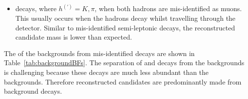 \begin{itemize}
\item \bhh decays, where $ h^{(')}  = K, \pi$, when both hadrons are mis-identified as muons. This usually occurs when the hadrons decay whilst travelling through the detector. Similar to mis-identified semi-leptonic decays, the reconstructed \bsd candidate mass is lower than expected. %
\end{itemize}

The \BFs of the backgrounds from mis-identified decays are shown in Table~\ref{tab:backgroundBFs}. The separation of \bdmumu and \bsmumu decays from the backgrounds is challenging because these decays are much less abundant than the backgrounds. Therefore reconstructed candidates are predominantly made from background decays.

